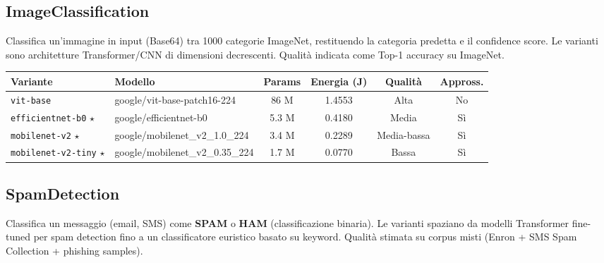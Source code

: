 \documentclass[a4paper,11pt]{article}
\begin{document}
\subsection{ImageClassification}

Classifica un'immagine in input (Base64) tra 1000 categorie ImageNet, restituendo la
categoria predetta e il confidence score. Le varianti sono architetture Transformer/CNN
di dimensioni decrescenti. Qualità indicata come Top-1 accuracy su ImageNet.

\begin{table}[h!]
\centering
\footnotesize
\setlength{\tabcolsep}{4pt}
\begin{tabular}{p{2.8cm}p{5.5cm}cccc}
\toprule
\textbf{Variante} & \textbf{Modello} & \textbf{Params} &
\textbf{Energia (J)} & \textbf{Qualità} & \textbf{Appross.} \\
\midrule
\texttt{vit-base}          & google/vit-base-patch16-224       & 86 M  & 1.4553 & Alta        & No \\
\texttt{efficientnet-b0} $\star$ & google/efficientnet-b0      & 5.3 M & 0.4180 & Media       & Sì \\
\texttt{mobilenet-v2}    $\star$ & google/mobilenet\_v2\_1.0\_224 & 3.4 M & 0.2289 & Media-bassa & Sì \\
\texttt{mobilenet-v2-tiny} $\star$ & google/mobilenet\_v2\_0.35\_224 & 1.7 M & 0.0770 & Bassa  & Sì \\
\bottomrule
\end{tabular}
\end{table}

\subsection{SpamDetection}

Classifica un messaggio (email, SMS) come \textbf{SPAM} o \textbf{HAM}
(classificazione binaria). Le varianti spaziano da modelli Transformer fine-tuned per
spam detection fino a un classificatore euristico basato su keyword. Qualità stimata
su corpus misti (Enron + SMS Spam Collection + phishing samples).
\end{document}

